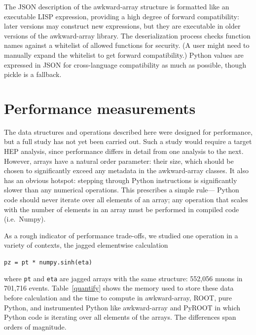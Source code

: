 \documentclass{webofc}
\begin{document}
The JSON description of the awkward-array structure is formatted like an executable LISP expression, providing a high degree of forward compatibility: later versions may construct new expressions, but they are executable in older versions of the awkward-array library. The deserialization process checks function names against a whitelist of allowed functions for security. (A user might need to manually expand the whitelist to get forward compatibility.) Python values are expressed in JSON for cross-language compatibility as much as possible, though pickle is a fallback.

\section{Performance measurements}

The data structures and operations described here were designed for performance, but a full study has not yet been carried out. Such a study would require a target HEP analysis, since performance differs in detail from one analysis to the next. However, arrays have a natural order parameter: their size, which should be chosen to significantly exceed any metadata in the awkward-array classes. It also has an obvious hotspot: stepping through Python instructions is significantly slower than any numerical operations. This prescribes a simple rule--- Python code should never iterate over all elements of an array; any operation that scales with the number of elements in an array must be performed in compiled code (i.e.\ Numpy).

As a rough indicator of performance trade-offs, we studied one operation in a variety of contexts, the jagged elementwise calculation
\begin{center}
\texttt{pz = pt * numpy.sinh(eta)}
\end{center}
\noindent where \texttt{pt} and \texttt{eta} are jagged arrays with the same structure: 552,056 muons in 701,716 events. Table~\ref{quantify} shows the memory used to store these data before calculation and the time to compute in awkward-array, ROOT, pure Python, and instrumented Python like awkward-array and PyROOT in which Python code is iterating over all elements of the arrays. The differences span orders of magnitude.
\end{document}
